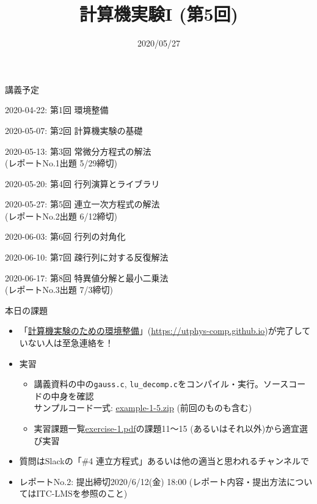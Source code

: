 \documentclass[10pt,dvipdfmx]{beamer}
\title{計算機実験I (第5回)}
\date{2020/05/27}
\begin{document}
\begin{frame}
  \titlepage
  \tableofcontents
\end{frame}

\begin{frame}[t]{講義予定}
  \begin{itemize}
  {\color{gray} \item 2020-04-22: 第1回 環境整備}
  {\color{gray} \item 2020-05-07: 第2回 計算機実験の基礎}
  {\color{gray} \item 2020-05-13: 第3回 常微分方程式の解法 \\
    \hspace*{5em} (レポートNo.1出題 5/29締切)}
  {\color{gray} \item 2020-05-20: 第4回 行列演算とライブラリ}
\item 2020-05-27: 第5回 連立一次方程式の解法 \\
  \hspace*{5em} (レポートNo.2出題 6/12締切)
\item 2020-06-03: 第6回 行列の対角化
\item 2020-06-10: 第7回 疎行列に対する反復解法
\item 2020-06-17: 第8回 特異値分解と最小二乗法 \\
  \hspace*{5em} (レポートNo.3出題 7/3締切)
  \end{itemize}
\end{frame}

\begin{frame}[t]{本日の課題}
  \begin{itemize}
  \item 「\href{https://utphys-comp.github.io}{計算機実験のための環境整備}」({\small \href{https://utphys-comp.github.io}{https://utphys-comp.github.io}})が完了していない人は至急連絡を！
  \item 実習
    \begin{itemize}
    \item 講義資料の中の{\tt gauss.c}, {\tt lu\_decomp.c}をコンパイル・実行。ソースコードの中身を確認 \\
      サンプルコード一式: \href{https://github.com/todo-group/ComputerExperiments/releases/tag/2020s-computer1}{example-1-5.zip} (前回のものも含む)
    \item 実習課題一覧\href{https://github.com/todo-group/ComputerExperiments/releases/tag/2020s-computer1}{exercise-1.pdf}の課題11〜15 (あるいはそれ以外)から適宜選び実習
    \end{itemize}
  \item 質問はSlackの「\#4 連立方程式」あるいは他の適当と思われるチャンネルで \\[2em]
    
  \item レポートNo.2: 提出締切2020/6/12(金) 18:00 (レポート内容・提出方法についてはITC-LMSを参照のこと)
  \end{itemize}
\end{frame}
\end{document}
